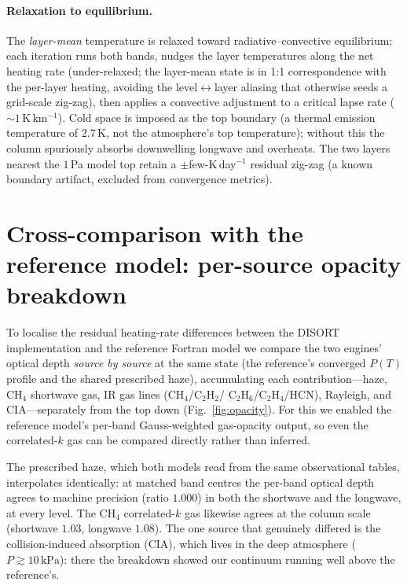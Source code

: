\documentclass[11pt]{article}
\begin{document}
\paragraph{Relaxation to equilibrium.} The \emph{layer-mean} temperature is
relaxed toward radiative--convective equilibrium: each iteration runs both
bands, nudges the layer temperatures along the net heating rate (under-relaxed;
the layer-mean state is in 1:1 correspondence with the per-layer heating,
avoiding the level$\leftrightarrow$layer aliasing that otherwise seeds a
grid-scale zig-zag), then applies a convective adjustment to a critical lapse
rate ($\sim\!1\,\mathrm{K\,km^{-1}}$). Cold space is imposed as the top boundary
(a thermal emission temperature of $2.7\,\mathrm{K}$, not the atmosphere's top
temperature); without this the column spuriously absorbs downwelling longwave
and overheats. The two layers nearest the $1$\,Pa model top retain a
$\pm$few-K\,day$^{-1}$ residual zig-zag (a known boundary artifact, excluded
from convergence metrics).

\section{Cross-comparison with the reference model: per-source opacity breakdown}
\label{si:opacity}

To localise the residual heating-rate differences between the DISORT
implementation and the reference Fortran model we compare the two engines'
optical depth \emph{source by source} at the same state (the reference's
converged $P(T)$ profile and the shared prescribed haze), accumulating each
contribution---haze, CH$_4$ shortwave gas, IR gas lines (CH$_4$/C$_2$H$_2$/%
C$_2$H$_6$/C$_2$H$_4$/HCN), Rayleigh, and CIA---separately from the top down
(Fig.~\ref{fig:opacity}). For this we enabled the reference model's
per-band Gauss-weighted gas-opacity output, so even the correlated-$k$ gas can
be compared directly rather than inferred.

The prescribed haze, which both models read from the same observational tables,
interpolates identically: at matched band centres the per-band optical depth
agrees to machine precision (ratio $1.000$) in both the shortwave and the
longwave, at every level. The CH$_4$ correlated-$k$ gas likewise agrees at the
column scale (shortwave $1.03$, longwave $1.08$). The one source that genuinely
differed is the collision-induced absorption (CIA), which lives in the deep
atmosphere ($P\gtrsim10\,\mathrm{kPa}$): there the breakdown showed our continuum
running well above the reference's.
\end{document}
